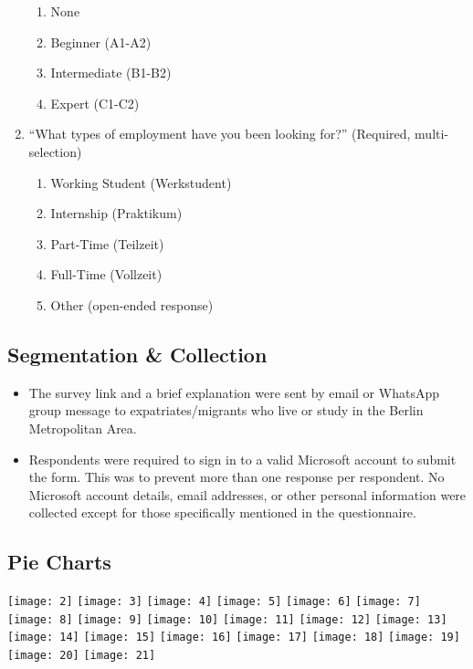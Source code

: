 \begin{enumerate}
	\begin{enumerate}
		\item None
		\item Beginner (A1-A2)
		\item Intermediate (B1-B2)
		\item Expert (C1-C2)
	\end{enumerate}
	\item “What types of employment have you been looking for?” (Required, multi-selection)
	\begin{enumerate}
		\item Working Student (Werkstudent)
		\item Internship (Praktikum)
		\item Part-Time (Teilzeit)
		\item Full-Time (Vollzeit)
		\item Other (open-ended response)
	\end{enumerate}
\end{enumerate}

\subsection*{Segmentation \& Collection}
\begin{itemize}
  \item The survey link and a brief explanation were sent by email or WhatsApp group message to expatriates/migrants who live or study in the Berlin Metropolitan Area.
  \item Respondents were required to sign in to a valid Microsoft account to submit the form. This was to prevent more than one response per respondent. No Microsoft account details, email addresses, or other personal information were collected except for those specifically mentioned in the questionnaire.
\end{itemize}

\subsection*{Pie Charts}
\noindent \centering
\graphicspath{ {./attachments/appA} }
\texttt{[image: 2]}
\texttt{[image: 3]}
\texttt{[image: 4]}
\texttt{[image: 5]}
\texttt{[image: 6]}
\texttt{[image: 7]}
\texttt{[image: 8]}
\texttt{[image: 9]}
\texttt{[image: 10]}
\texttt{[image: 11]}
\texttt{[image: 12]}
\texttt{[image: 13]}
\texttt{[image: 14]}
\texttt{[image: 15]}
\texttt{[image: 16]}
\texttt{[image: 17]}
\texttt{[image: 18]}
\texttt{[image: 19]}
\texttt{[image: 20]}
\texttt{[image: 21]}

\justifying
\clearpage